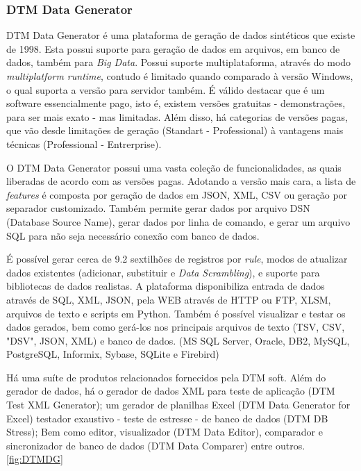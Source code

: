 \documentclass[
	12pt,				%
	openright,			%
	twoside,			%
	a4paper,			%
	english,			%
	brazil				%
	]{abntex2}
\begin{document}
	\subsubsection{DTM Data Generator}
	DTM Data Generator \cite{DTMDataGenerator} é uma plataforma de geração de dados sintéticos que existe de 1998.
	Esta possui suporte para geração de dados em arquivos, em banco de dados, também para \emph{Big Data}.
	Possui suporte multiplataforma, através do modo \emph{multiplatform runtime}, contudo é limitado quando comparado à versão Windows, o qual suporta a versão para servidor também.
	É válido destacar que é um software essencialmente pago, isto é, existem versões gratuitas - demonstrações, para ser mais exato - mas limitadas.
	Além disso, há categorias de versões pagas, que vão desde limitações de geração (Standart - Professional) à vantagens mais técnicas (Professional - Entrerprise).
	\par
	O DTM Data Generator possui uma vasta coleção de funcionalidades, as quais liberadas de acordo com as versões pagas.
	Adotando a versão mais cara, a lista de \emph{features} é composta por geração de dados em JSON, XML, CSV ou geração por separador customizado.
	Também permite gerar dados por arquivo DSN (Database Source Name), gerar dados por linha de comando, e gerar um arquivo SQL para não seja necessário conexão com banco de dados.
	\par
	É possível gerar cerca de 9.2 sextilhões de registros por \emph{rule}, modos de atualizar dados existentes (adicionar, substituir e \emph{Data Scrambling}), e suporte para bibliotecas de dados realistas.
	A plataforma disponibiliza entrada de dados através de SQL, XML, JSON, pela WEB através de HTTP ou FTP, XLSM, arquivos de texto e scripts em Python.
	Também é possível visualizar e testar os dados gerados, bem como gerá-los nos principais arquivos de texto (TSV, CSV, "DSV", JSON, XML) e banco de dados. (MS SQL Server, Oracle, DB2, MySQL, PostgreSQL, Informix, Sybase, SQLite e Firebird) 
	\par
	Há uma suíte de produtos relacionados fornecidos pela DTM soft. 
	Além do gerador de dados, 
		há o gerador de dados XML para teste de aplicação (DTM Test XML Generator);
		um gerador de planilhas Excel (DTM Data Generator for Excel)
		testador exaustivo - teste de estresse - de banco de dados (DTM DB Stress);
		Bem como editor, visualizador (DTM Data Editor), comparador e sincronizador de banco de dados (DTM Data Comparer) entre outros. 
	\ref{fig:DTMDG}
\end{document}

